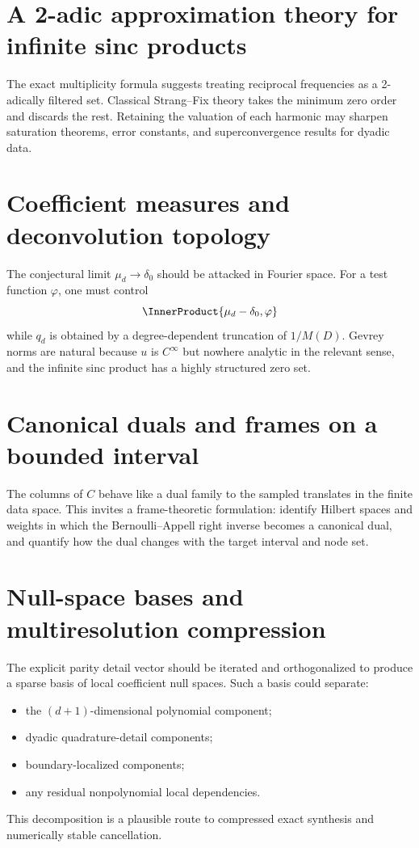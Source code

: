 \documentclass[11pt,oneside]{book}
\theoremstyle{definition}
\theoremstyle{remark}
\begin{document}
\section{A 2-adic approximation theory for infinite sinc products}
The exact multiplicity formula suggests treating reciprocal frequencies as a 2-adically filtered set.  Classical Strang--Fix theory takes the minimum zero order and discards the rest.  Retaining the valuation of each harmonic may sharpen saturation theorems, error constants, and superconvergence results for dyadic data.

\section{Coefficient measures and deconvolution topology}
The conjectural limit \(\mu_d\to\delta_0\) should be attacked in Fourier space.  For a test function \(\varphi\), one must control
\[
 \InnerProduct{\mu_d-\delta_0,\varphi}
\]
while \(q_d\) is obtained by a degree-dependent truncation of \(1/M(D)\).  Gevrey norms are natural because \(u\) is \(C^\infty\) but nowhere analytic in the relevant sense, and the infinite sinc product has a highly structured zero set.

\section{Canonical duals and frames on a bounded interval}
The columns of \(C\) behave like a dual family to the sampled translates in the finite data space.  This invites a frame-theoretic formulation: identify Hilbert spaces and weights in which the Bernoulli--Appell right inverse becomes a canonical dual, and quantify how the dual changes with the target interval and node set.

\section{Null-space bases and multiresolution compression}
The explicit parity detail vector should be iterated and orthogonalized to produce a sparse basis of local coefficient null spaces.  Such a basis could separate:
\begin{itemize}
\item the \((d+1)\)-dimensional polynomial component;
\item dyadic quadrature-detail components;
\item boundary-localized components;
\item any residual nonpolynomial local dependencies.
\end{itemize}
This decomposition is a plausible route to compressed exact synthesis and numerically stable cancellation.
\end{document}
